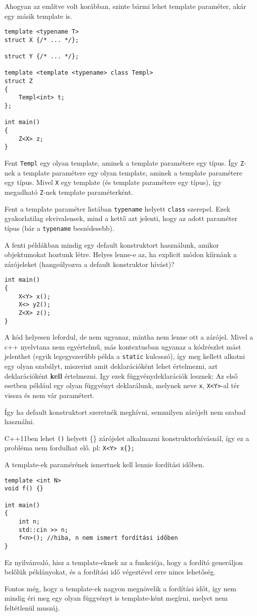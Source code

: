 \documentclass[a4paper,11.5pt,table]{article}
\begin{document}
	\smallskip
	Ahogyan az említve volt korábban, szinte bármi lehet template paraméter, akár egy másik template is.

\begin{lstlisting}
template <typename T>
struct X {/* ... */};

struct Y {/* ... */};

template <template <typename> class Templ>
struct Z
{
	Templ<int> t;
};

int main()
{
	Z<X> z;
}
\end{lstlisting}
	Fent \texttt{Templ} egy olyan template, aminek a template paramétere egy típus. Így \texttt{Z}-nek a template paramétere egy olyan template, aminek a template paramétere egy típus. Mivel \texttt{X} egy template (és template paramétere egy típus), így megadható \texttt{Z}-nek template paraméterként.
	\begin{note}
		Fent a template paraméter listában \texttt{typename} helyett \texttt{class} szerepel. Ezek gyakorlatilag ekvivalensek, mind a kettő azt jelenti, hogy az adott paraméter típus (bár a \texttt{typename} beszédesebb).
	\end{note}
	
	A fenti példákban mindig egy default konstruktort használunk, amikor objektumokat hoztunk létre. Helyes lenne-e az, ha explicit módon kíírnánk a zárójeleket (hangsúlyozva a default konstruktor hívást)?
\begin{lstlisting}
int main()
{
	X<Y> x();
	X<> y2();
	Z<X> z();
}
\end{lstlisting}
	A kód helyesen lefordul, de nem ugyanaz, mintha nem lenne ott a zárójel. Mivel a c++ nyelvtana nem egyértelmű, más kontextusban ugyanaz a kódrészlet mást jelenthet (egyik legegyszerűbb példa a \texttt{static} kulcsszó), így meg kellett alkotni egy olyan szabályt, miszerint amit deklarációként lehet értelmezni, azt deklarációként \textbf{kell} értelmezni. Igy ezek függvénydeklarációk lesznek: Az első esetben például egy olyan függvényt deklarálunk, melynek neve \texttt{x}, \texttt{X<Y>}-al tér vissza és nem vár paramétert. 
	
	Így ha default konstruktort szeretnék meghívni, semmilyen zárójelt nem szabad használni.
	\begin{note}
		C++11ben lehet \texttt{()} helyett \{\} zárójelet alkalmazni konstruktorhívásnál, így ez a probléma nem fordulhat elő. pl: \texttt{X<Y> x\{\};}
	\end{note}
	
	A template-ek paramérének ismertnek kell lennie fordítási időben.
	\begin{lstlisting}
template <int N>
void f() {}

int main()
{
	int n;
	std::cin >> n;
	f<n>(); //hiba, n nem ismert fordítási időben
}
	\end{lstlisting}
	Ez nyilvánvaló, hisz a template-eknek az a funkciója, hogy a fordító generáljon belőlük példányokat, és a fordítási idő végeztével erre nincs lehetőség.
	\begin{note}
		Fontos még, hogy a template-ek nagyon megnövelik a fordítási időt, így nem mindig éri meg egy olyan függvényt is template-ként megírni, melyet nem feltétlenül muszáj.
	\end{note}
\end{document}
